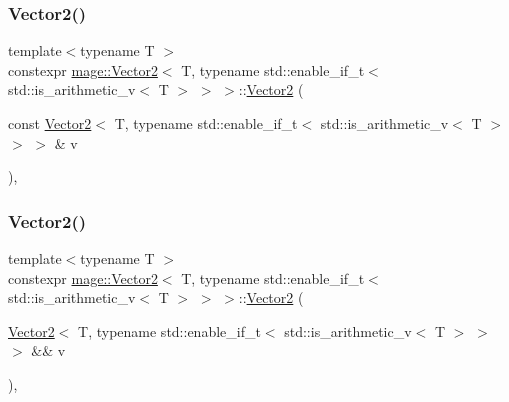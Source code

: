 \subsubsection{\texorpdfstring{Vector2()}{Vector2()}\hspace{0.1cm}{\footnotesize\ttfamily [4/6]}}
{\footnotesize\ttfamily template$<$typename T $>$ \\
constexpr \hyperlink{structmage_1_1_vector2}{mage\+::\+Vector2}$<$ T, typename std\+::enable\+\_\+if\+\_\+t$<$ std\+::is\+\_\+arithmetic\+\_\+v$<$ T $>$ $>$ $>$\+::\hyperlink{structmage_1_1_vector2}{Vector2} (\begin{DoxyParamCaption}\item[{const \hyperlink{structmage_1_1_vector2}{Vector2}$<$ T, typename std\+::enable\+\_\+if\+\_\+t$<$ std\+::is\+\_\+arithmetic\+\_\+v$<$ T $>$ $>$ $>$ \&}]{v }\end{DoxyParamCaption})\hspace{0.3cm}{\ttfamily [default]}, {\ttfamily [noexcept]}}

\hypertarget{structmage_1_1_vector2_3_01_t_00_01typename_01std_1_1enable__if__t_3_01std_1_1is__arithmetic__v_3_01_t_01_4_01_4_01_4_aab19ae0f522e4292dc53322a5a3e332c}{}\label{structmage_1_1_vector2_3_01_t_00_01typename_01std_1_1enable__if__t_3_01std_1_1is__arithmetic__v_3_01_t_01_4_01_4_01_4_aab19ae0f522e4292dc53322a5a3e332c} 
\subsubsection{\texorpdfstring{Vector2()}{Vector2()}\hspace{0.1cm}{\footnotesize\ttfamily [5/6]}}
{\footnotesize\ttfamily template$<$typename T $>$ \\
constexpr \hyperlink{structmage_1_1_vector2}{mage\+::\+Vector2}$<$ T, typename std\+::enable\+\_\+if\+\_\+t$<$ std\+::is\+\_\+arithmetic\+\_\+v$<$ T $>$ $>$ $>$\+::\hyperlink{structmage_1_1_vector2}{Vector2} (\begin{DoxyParamCaption}\item[{\hyperlink{structmage_1_1_vector2}{Vector2}$<$ T, typename std\+::enable\+\_\+if\+\_\+t$<$ std\+::is\+\_\+arithmetic\+\_\+v$<$ T $>$ $>$ $>$ \&\&}]{v }\end{DoxyParamCaption})\hspace{0.3cm}{\ttfamily [default]}, {\ttfamily [noexcept]}}


